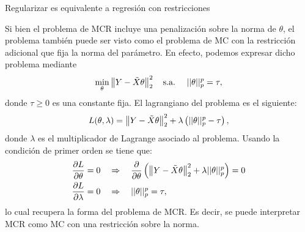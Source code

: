 \documentclass[handout, 9pt]{beamer}
\begin{document}
\begin{frame}{Regularizar es equivalente a regresión con restricciones}

Si bien el problema de MCR incluye una penalización sobre la norma de $\theta$, el problema también puede ser visto como el problema de MC con la restricción adicional que fija la norma del parámetro. \pause En efecto, podemos expresar dicho problema mediante
\begin{align*}
	\min_\theta  \left\lVert Y-\tilde{X}\theta\right\rVert_2^2\label{eq:dual_MCR1}
	\quad\text{s.a.} \quad \ ||\theta||_p^p = \tau,
\end{align*}
donde $\tau\geq0$ es una constante fija. \pause El lagrangiano del problema es el siguiente:
\begin{equation*}
	L(\theta,\lambda) = \left\lVert Y-\tilde{X}\theta\right\rVert_2^2 + \lambda \left(||\theta||_p^p - \tau\right),
\end{equation*}
donde $\lambda$ es el multiplicador de Lagrange asociado al problema. \pause Usando la condición de primer orden se tiene que: 
\begin{align*}
	\frac{\partial L}{\partial \theta} = 0 &\quad\Rightarrow\quad  \frac{\partial }{\partial \theta}\left(\left\lVert Y-\tilde{X}\theta\right\rVert_2^2 + \lambda ||\theta||_p^p \right) = 0\\
	\frac{\partial L}{\partial \lambda} = 0 &\quad\Rightarrow\quad ||\theta||_p^p = \tau,
\end{align*}\pause
lo cual recupera la forma del problema de MCR. Es decir, se puede interpretar MCR como MC con una restricción sobre la norma.

\end{frame}
\end{document}
